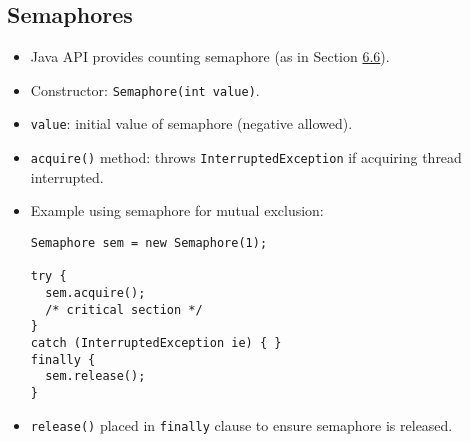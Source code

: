 \subsection{Semaphores}
\begin{itemize}
    \item Java API provides counting semaphore (as in Section \hyperref[sec:6.6]{6.6}).
    \item Constructor: \texttt{Semaphore(int value)}.
    \item \texttt{value}: initial value of semaphore (negative allowed).
    \item \texttt{acquire()} method: throws \texttt{InterruptedException} if acquiring thread interrupted.
    \item Example using semaphore for mutual exclusion:
    \begin{verbatim}
Semaphore sem = new Semaphore(1);
 
try {
  sem.acquire();
  /* critical section */
}
catch (InterruptedException ie) { }
finally {
  sem.release();
}
    \end{verbatim}
    \item \texttt{release()} placed in \texttt{finally} clause to ensure semaphore is released.
\end{itemize}

